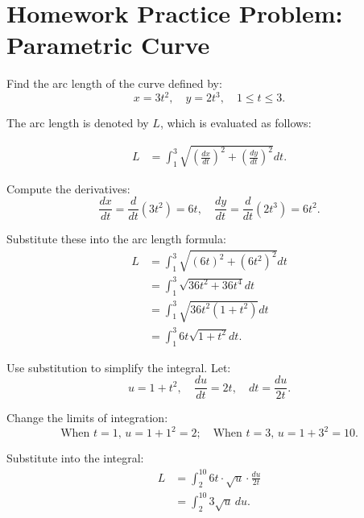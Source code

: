 \documentclass{article}
\begin{document}
\section*{Homework Practice Problem: Parametric Curve}
\begin{notebox}
    Find the arc length of the curve defined by:
    \[
        x = 3t^2, \quad y = 2t^3, \quad 1 \leq t \leq 3.
    \]

    \begin{solutionbox}
        The arc length is denoted by \( L \), which is evaluated as follows:

    \begin{equation*}
        \begin{aligned}
            L &= \int_{1}^{3} \sqrt{\left(\frac{dx}{dt}\right)^2 + \left(\frac{dy}{dt}\right)^2} dt.
        \end{aligned}
    \end{equation*}

    Compute the derivatives:
    \[
        \frac{dx}{dt} = \frac{d}{dt}(3t^2) = 6t, \quad \frac{dy}{dt} = \frac{d}{dt}(2t^3) = 6t^2.
    \]

    Substitute these into the arc length formula:
    \begin{equation*}
        \begin{aligned}
            L &= \int_{1}^{3} \sqrt{(6t)^2 + (6t^2)^2} dt \\
            &= \int_{1}^{3} \sqrt{36t^2 + 36t^4} dt \\
            &= \int_{1}^{3} \sqrt{36t^2(1 + t^2)} dt \\
            &= \int_{1}^{3} 6t\sqrt{1 + t^2} dt.
        \end{aligned}
    \end{equation*}

    Use substitution to simplify the integral. Let:
    \[
        u = 1 + t^2, \quad \frac{du}{dt} = 2t, \quad dt = \frac{du}{2t}.
    \]

    Change the limits of integration:
    \[
        \text{When } t = 1, \, u = 1 + 1^2 = 2; \quad \text{When } t = 3, \, u = 1 + 3^2 = 10.
    \]

    Substitute into the integral:
    \begin{equation*}
        \begin{aligned}
            L &= \int_{2}^{10} 6t \cdot \sqrt{u} \cdot \frac{du}{2t} \\
            &= \int_{2}^{10} 3\sqrt{u} \, du.
        \end{aligned}
    \end{equation*}
    \end{solutionbox}
\end{notebox}
\end{document}
